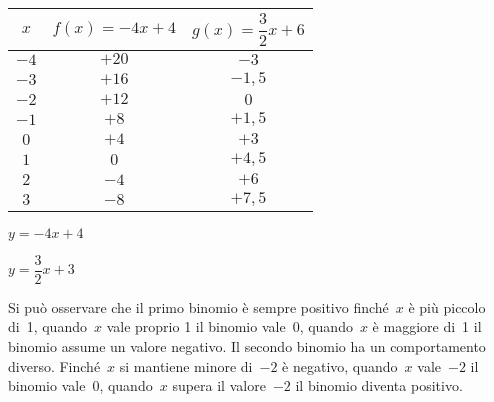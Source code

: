  \begin{minipage}[]{.45\textwidth}
\begin{center}
 \begin{tabular}{c|c|c}
  \(x\) & \(f(x) = -4 x +4\) & \(g(x) = \dfrac{3}{2} x +6\) \\
  \hline
  \(-4\) & \(+20\) & \(-3\) \\
  \(-3\) & \(+16\) & \(-1,5\) \\
  \(-2\) & \(+12\) & \(0\) \\
  \(-1\) & \(+8\) & \(+1,5\) \\
  \( 0\) & \(+4\) & \(+3\) \\
  \( 1\) & \(0\) & \(+4,5\) \\
  \( 2\) & \(-4\) & \(+6\) \\
  \( 3\) & \(-8\) & \(+7,5\) %
 \end{tabular}
\end{center}
 \end{minipage}
 \hfill
 \begin{minipage}[]{.25\textwidth}
\begin{center} 
\disrettaa 
\vspace{3mm}
\(y = -4 x +4\)
\end{center}
 \end{minipage}
 \hfill
 \begin{minipage}[]{.25\textwidth}
\begin{center} 
\disrettab 
\(y = \dfrac{3}{2} x +3\)
\end{center}
 \end{minipage}

Si può osservare che il primo binomio è sempre positivo finché~\(x\) è più 
piccolo di~1, quando~\(x\) vale proprio 1 il binomio vale~0, quando~\(x\) è 
maggiore di~1 il binomio assume un valore negativo.
Il secondo binomio ha un comportamento diverso. Finché~\(x\) si mantiene 
minore di~\(-2\) è negativo, quando~\(x\) vale~\(-2\) il binomio vale~0, 
quando~\(x\) supera il valore~\(-2\) il binomio diventa positivo.

